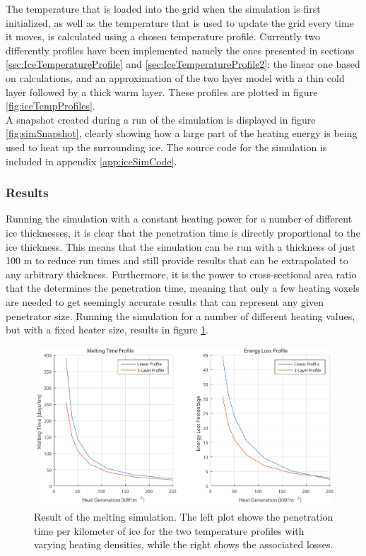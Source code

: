 \noindent
The temperature that is loaded into the grid when the simulation is first initialized, as well as the temperature that is used to update the grid every time it moves, is calculated using a chosen temperature profile. Currently two differently profiles have been implemented namely the ones presented in sections \ref{sec:IceTemperatureProfile} and \ref{sec:IceTemperatureProfile2}: the linear one based on calculations, and an approximation of the two layer model with a thin cold layer followed by a thick warm layer. These profiles are plotted in figure \ref{fig:iceTempProfiles}.\\

\noindent 
A snapshot created during a run of the simulation is displayed in figure \ref{fig:simSnapshot}, clearly showing how a large part of the heating energy is being used to heat up the surrounding ice. The source code for the simulation is included in appendix \ref{app:iceSimCode}.


\subsubsection{Results}
Running the simulation with a constant heating power for a number of different ice thicknesses, it is clear that the penetration time is directly proportional to the ice thickness. This means that the simulation can be run with a thickness of just 100 m to reduce run times and still provide results that can be extrapolated to any arbitrary thickness. Furthermore, it is the power to cross-sectional area ratio that the determines the penetration time, meaning that only a few heating voxels are needed to get seemingly accurate results that can represent any given penetrator size. Running the simulation for a number of different heating values, but with a fixed heater size, results in figure \ref{fig:simResults}.

\begin{figure}[ht]
	\centering
	\includegraphics[width=.9\textwidth]{figures/LAMC/simResult.pdf}
	\caption{Result of the melting simulation. The left plot shows the penetration time per kilometer of ice for the two temperature profiles with varying heating densities, while the right shows the associated losses.}
	\label{fig:simResults}
\end{figure}

